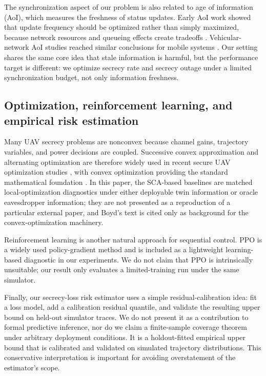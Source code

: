 The synchronization aspect of our problem is also related to age of information (AoI), which measures the freshness of status updates. Early AoI work showed that update frequency should be optimized rather than simply maximized, because network resources and queueing effects create tradeoffs \cite{kaul2012aoi}. Vehicular-network AoI studies reached similar conclusions for mobile systems \cite{kaul2011vehicular}. Our setting shares the same core idea that stale information is harmful, but the performance target is different: we optimize secrecy rate and secrecy outage under a limited synchronization budget, not only information freshness.

\subsection{Optimization, reinforcement learning, and empirical risk estimation}

Many UAV secrecy problems are nonconvex because channel gains, trajectory variables, and power decisions are coupled. Successive convex approximation and alternating optimization are therefore widely used in recent secure UAV optimization studies \cite{mao2023secureuavmec,wei2024isncsecureuav,lu2024securemaritimemec,liu2024secureisacuav}, with convex optimization providing the standard mathematical foundation \cite{boyd2004convex}. In this paper, the SCA-based baselines are matched local-optimization diagnostics under either deployable twin information or oracle eavesdropper information; they are not presented as a reproduction of a particular external paper, and Boyd's text is cited only as background for the convex-optimization machinery.

Reinforcement learning is another natural approach for sequential control. PPO \cite{schulman2017ppo} is a widely used policy-gradient method and is included as a lightweight learning-based diagnostic in our experiments. We do not claim that PPO is intrinsically unsuitable; our result only evaluates a limited-training run under the same simulator.

Finally, our secrecy-loss risk estimator uses a simple residual-calibration idea: fit a loss model, add a calibration residual quantile, and validate the resulting upper bound on held-out simulator traces. We do not present it as a contribution to formal predictive inference, nor do we claim a finite-sample coverage theorem under arbitrary deployment conditions. It is a holdout-fitted empirical upper bound that is calibrated and validated on simulated trajectory distributions. This conservative interpretation is important for avoiding overstatement of the estimator's scope.
